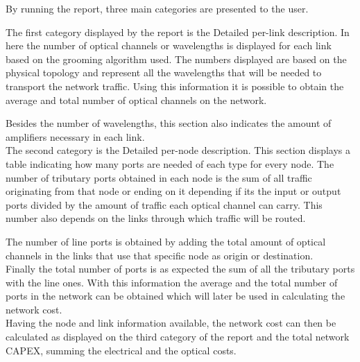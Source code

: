 	By running the report, three main categories are presented to the user.
	
	The first category displayed by the report is the Detailed per-link description. In here the number of optical channels or wavelengths is displayed for each link based on the grooming algorithm used. The numbers displayed are based on the physical topology and represent all the wavelengths that will be needed to transport the network traffic. Using this information it is possible to obtain the average and total number of optical channels on the network.
	
	Besides the number of wavelengths, this section also indicates the amount of amplifiers necessary in each link. \\
	
	The second category is the Detailed per-node description. This section displays a table indicating how many ports are needed of each type for every node. The number of tributary ports obtained in each node is the sum of all traffic originating from that node or ending on it depending if its the input or output ports divided by the amount of traffic each optical channel can carry. This number also depends on the links through which traffic will be routed. %
	
	The number of line ports is obtained by adding the total amount of optical channels in the links that use that specific node as origin or destination.\\
	
	Finally the total number of ports is as expected the sum of all the tributary ports with the line ones. With this information the average and the total number of ports in the network can be obtained which will later be used in calculating the network cost.\\
	
	Having the node and link information available, the network cost can then be calculated as displayed on the third category of the report and the total network CAPEX, summing the electrical and the optical costs.							

	
	
